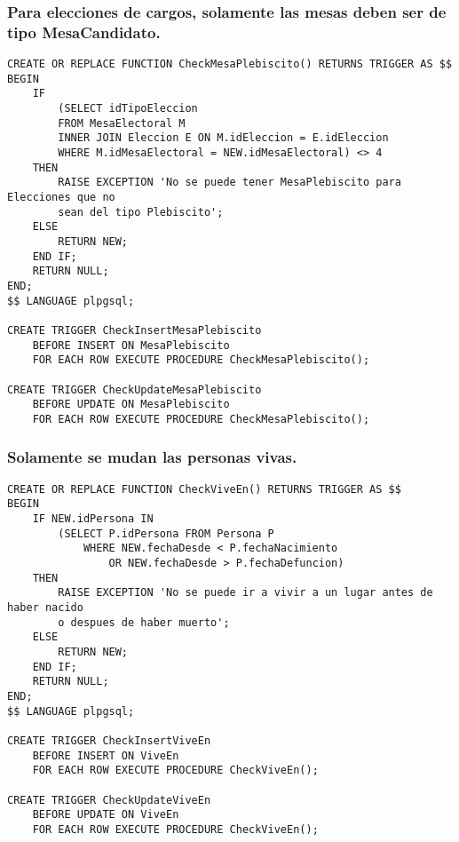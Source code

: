 \subsubsection{Para elecciones de cargos, solamente las mesas deben ser de tipo MesaCandidato.}
\begin{verbatim}
CREATE OR REPLACE FUNCTION CheckMesaPlebiscito() RETURNS TRIGGER AS $$
BEGIN
    IF 
        (SELECT idTipoEleccion 
        FROM MesaElectoral M 
        INNER JOIN Eleccion E ON M.idEleccion = E.idEleccion
        WHERE M.idMesaElectoral = NEW.idMesaElectoral) <> 4  
    THEN
        RAISE EXCEPTION 'No se puede tener MesaPlebiscito para Elecciones que no 
        sean del tipo Plebiscito';
    ELSE
        RETURN NEW;
    END IF;
    RETURN NULL;
END;
$$ LANGUAGE plpgsql;
                                        
CREATE TRIGGER CheckInsertMesaPlebiscito
    BEFORE INSERT ON MesaPlebiscito
    FOR EACH ROW EXECUTE PROCEDURE CheckMesaPlebiscito();
    
CREATE TRIGGER CheckUpdateMesaPlebiscito
    BEFORE UPDATE ON MesaPlebiscito
    FOR EACH ROW EXECUTE PROCEDURE CheckMesaPlebiscito();
\end{verbatim}

\subsubsection{Solamente se mudan las personas vivas.}
\begin{verbatim}
CREATE OR REPLACE FUNCTION CheckViveEn() RETURNS TRIGGER AS $$
BEGIN
    IF NEW.idPersona IN 
        (SELECT P.idPersona FROM Persona P 
            WHERE NEW.fechaDesde < P.fechaNacimiento 
                OR NEW.fechaDesde > P.fechaDefuncion)
    THEN
        RAISE EXCEPTION 'No se puede ir a vivir a un lugar antes de haber nacido 
        o despues de haber muerto';
    ELSE
        RETURN NEW;
    END IF;
    RETURN NULL;
END;
$$ LANGUAGE plpgsql;

CREATE TRIGGER CheckInsertViveEn
    BEFORE INSERT ON ViveEn
    FOR EACH ROW EXECUTE PROCEDURE CheckViveEn();
    
CREATE TRIGGER CheckUpdateViveEn
    BEFORE UPDATE ON ViveEn
    FOR EACH ROW EXECUTE PROCEDURE CheckViveEn();
\end{verbatim}


